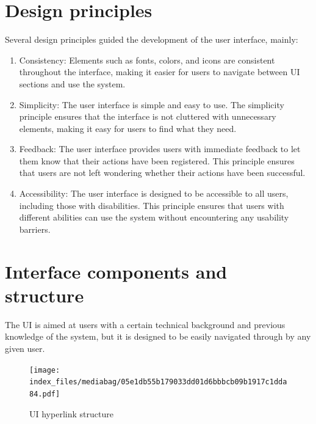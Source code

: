 \documentclass[
  letterpaper,
  a4paper,
  12pt,
  titlepage,
  oneside,
  openany]{book}
\providecommand{\tightlist}{%
  \setlength{\itemsep}{0pt}\setlength{\parskip}{0pt}}\usepackage{longtable,booktabs,array}
\begin{document}
\hypertarget{design-principles}{%
\section{Design principles}\label{design-principles}}

Several design principles guided the development of the user interface,
mainly:

\begin{enumerate}
\def\labelenumi{\arabic{enumi}.}
\tightlist
\item
  Consistency: Elements such as fonts, colors, and icons are consistent
  throughout the interface, making it easier for users to navigate
  between UI sections and use the system.
\item
  Simplicity: The user interface is simple and easy to use. The
  simplicity principle ensures that the interface is not cluttered with
  unnecessary elements, making it easy for users to find what they need.
\item
  Feedback: The user interface provides users with immediate feedback to
  let them know that their actions have been registered. This principle
  ensures that users are not left wondering whether their actions have
  been successful.
\item
  Accessibility: The user interface is designed to be accessible to all
  users, including those with disabilities. This principle ensures that
  users with different abilities can use the system without encountering
  any usability barriers.
\end{enumerate}

\newpage{}

\hypertarget{interface-components-and-structure}{%
\section{Interface components and
structure}\label{interface-components-and-structure}}

The UI is aimed at users with a certain technical background and
previous knowledge of the system, but it is designed to be easily
navigated through by any given user.

\begin{figure}[h!]

{\centering \texttt{[image: index\_files/mediabag/05e1db55b179033dd01d6bbbcb09b1917c1dda84.pdf]}

}

\caption{UI hyperlink structure}

\end{figure}
\end{document}
